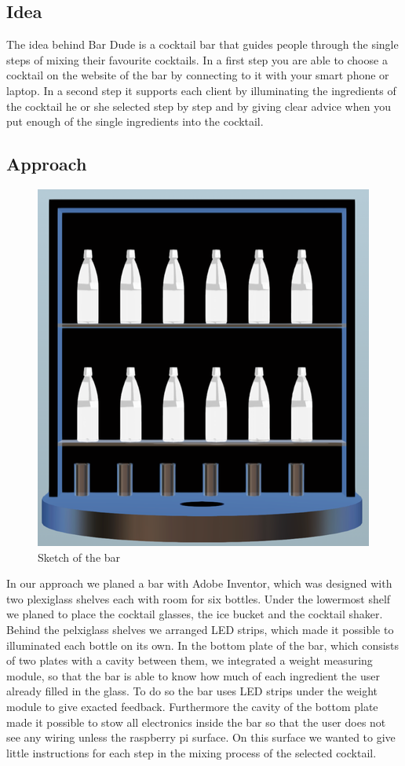 \documentclass{acm_proc_article-sp}
\begin{document}
\subsection{Idea}
The idea behind Bar Dude is a cocktail bar that guides people through the single steps of mixing their favourite cocktails. In a first step you are able to choose a cocktail on the website of the bar by connecting to it with your smart phone or laptop. In a second step it supports each client by illuminating the ingredients of the cocktail he or she selected step by step and by giving clear advice when you put enough of the single ingredients into the cocktail.
\subsection{Approach}

\begin{figure}[htbp] 
  \centering
     \includegraphics[width=0.5\linewidth]{pictures/bar_inventor.png}
  \caption{Sketch of the bar}
  \label{fig:bar_inventor}
\end{figure}
In our approach we planed a bar with Adobe Inventor, which was designed with two plexiglass shelves each with room for six bottles. Under the lowermost shelf we planed to place the cocktail glasses, the ice bucket and the cocktail shaker. Behind the pelxiglass shelves we arranged LED strips, which made it possible to illuminated each bottle on its own.
In the bottom plate of the bar, which consists of two plates with a cavity between them, we integrated a weight measuring module, so that the bar is able to know how much of each ingredient the user already filled in the glass. To do so the bar uses LED strips under the weight module to give exacted feedback.  
Furthermore the cavity of the bottom plate made it possible to stow all electronics inside the bar so that the user does not see any wiring unless the raspberry pi surface. On this surface we wanted to give little instructions for each step in the mixing process of the selected cocktail.
\end{document}
